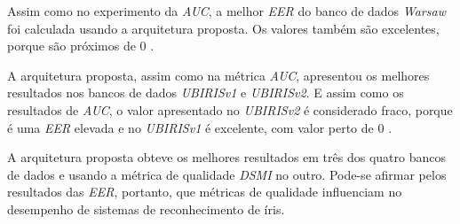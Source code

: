 \par Assim como no experimento da \textit{\acrshort{AUC}}, a melhor \textit{\acrshort{EER}} do banco de dados \textit{\acrshort{Warsaw}} foi calculada usando a arquitetura proposta. Os valores também são excelentes, porque são próximos de 0 \cite{eer, d33BEAT}.


\par A arquitetura proposta, assim como na métrica \textit{\acrshort{AUC}}, apresentou os melhores resultados nos bancos de dados \textit{UBIRISv1} e \textit{UBIRISv2}. E assim como os resultados de \textit{\acrshort{AUC}}, o valor apresentado no \textit{UBIRISv2} é considerado fraco, porque é uma \textit{\acrshort{EER}} elevada e no \textit{UBIRISv1} é excelente, com valor perto de 0 \cite{eer, d33BEAT}.

\par A arquitetura proposta obteve os melhores resultados em três dos quatro bancos de dados e usando a métrica de qualidade \textit{\acrshort{DSMI}} no outro. Pode-se afirmar pelos resultados das \textit{\acrshort{EER}}, portanto, que métricas de qualidade influenciam no desempenho de sistemas de reconhecimento de íris.


